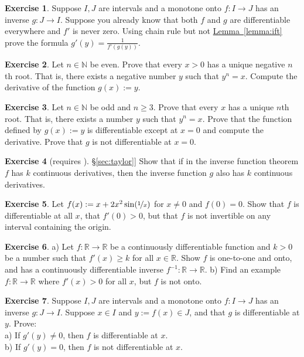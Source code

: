 \documentclass[12pt]{book}
\newcommand{\R}{{\mathbb{R}}}
\newcommand{\N}{{\mathbb{N}}}
\theoremstyle{plain}
\theoremstyle{remark}
\theoremstyle{definition}
\theoremstyle{exercise}
\newtheorem{exercise}{Exercise}[section]
\theoremstyle{example}
\newcommand{\sectionref}[1]{\hyperref[#1]{\S\ref*{#1}}}
\newcommand{\lemmaref}[1]{\hyperref[#1]{Lemma~\ref*{#1}}}
\begin{document}
\begin{exercise}
Suppose $I,J$ are intervals and a monotone onto $f \colon I \to J$ has an inverse $g \colon J \to I$.
Suppose you already know that both $f$ and $g$ are differentiable
everywhere and $f'$ is never zero.  Using chain rule but not \lemmaref{lemma:ift} prove the
formula $g'(y) = \frac{1}{f'(g(y))}$. %
\end{exercise}

\begin{exercise}
Let $n\in \N$ be even.
Prove that every $x > 0$ has a unique negative $n$th root.
That is, there exists a negative number $y$ such that $y^n = x$.
Compute the derivative
of the function $g(x) := y$.
\end{exercise}

\begin{exercise} \label{exercise:oddroot}
Let $n \in \N$ be odd and $n \geq 3$.
Prove that every $x$ has a unique $n$th root.
That is, there exists a number $y$ such that $y^n = x$.  Prove that
the function defined by $g(x) := y$ is differentiable except at $x=0$
and compute the derivative.  Prove that $g$ is not differentiable at $x=0$.
\end{exercise}

\begin{exercise}[requires \sectionref{sec:taylor}]
Show that if in the inverse function theorem $f$ has $k$ continuous
derivatives, then the inverse function $g$ also has $k$ continuous
derivatives.
\end{exercise}

\begin{exercise}
Let $f(x) := x + 2 x^2 \sin(\nicefrac{1}{x})$ for $x \not= 0$ and
$f(0) = 0$.  Show that $f$ is differentiable at all $x$, that $f'(0) > 0$,
but that $f$ is not invertible
on any interval containing the origin.
\end{exercise}

\begin{exercise}
a) Let $f \colon \R \to \R$ be a continuously differentiable function
and $k > 0$ be a number such that $f'(x) \geq k$ for all $x \in \R$.
Show $f$ is one-to-one and onto, and has a continuously differentiable
inverse $f^{-1} \colon \R \to \R$. b) Find an example $f \colon \R \to \R$
where $f'(x) > 0$
for all $x$, but $f$ is not onto.
\end{exercise}

\begin{exercise}
Suppose $I,J$ are intervals and a monotone onto $f \colon I \to J$ has an inverse $g \colon J \to I$.
Suppose $x \in I$ and $y := f(x) \in J$, and that $g$ is differentiable at
$y$.  Prove:
\\
a) If $g'(y) \not= 0$, then $f$ is differentiable at $x$.
\\
b) If $g'(y) = 0$, then $f$ is not differentiable at $x$.
\end{exercise}
\end{document}
